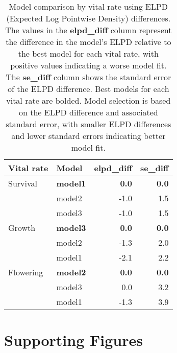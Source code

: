 \documentclass[12pt]{article}\usepackage[]{graphicx}\usepackage[dvipsnames]{xcolor}
\begin{document}
\begin{table}[H]
\caption{Model comparison by vital rate using ELPD (Expected Log Pointwise Density) differences. The values in the \textbf{elpd\_diff} column represent the difference in the model's ELPD relative to the best model for each vital rate, with positive values indicating a worse model fit. The \textbf{se\_diff} column shows the standard error of the ELPD difference. Best models for each vital rate are bolded. Model selection is based on the ELPD difference and associated standard error, with smaller ELPD differences and lower standard errors indicating better model fit.}
\centering
\begin{tabular}{|l|l|r|r|}
\hline
\textbf{Vital rate} & \textbf{Model} & \textbf{elpd\_diff} & \textbf{se\_diff} \\
\hline
Survival   & \textbf{model1} & \textbf{0.0}   & \textbf{0.0} \\
           & model2          & -1.0           & 1.5          \\
           & model3          & -1.0           & 1.5          \\
\hline
Growth     & \textbf{model3} & \textbf{0.0}   & \textbf{0.0} \\
           & model2          & -1.3           & 2.0          \\
           & model1          & -2.1           & 2.2          \\
\hline
Flowering  & \textbf{model2} & \textbf{0.0}   & \textbf{0.0} \\
           & model3          & 0.0            & 3.2          \\
           & model1          & -1.3           & 3.9          \\
\hline
\end{tabular}
\label{tab:elpd_vital_rates}
\end{table}





\section {Supporting Figures}
\end{document}
